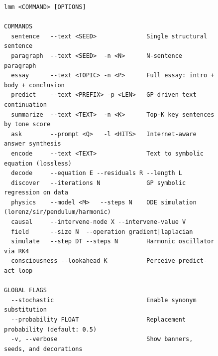 \documentclass[11pt,a4paper]{article}
\newcommand{\lmm}{\texorpdfstring{%
  \textbf{\color{lmmAccent}LMM}}{LMM}}
\begin{document}
\begin{figure}[H]
\begin{lstlisting}[style=code, caption={\lmm{} CLI command summary}]
lmm <COMMAND> [OPTIONS]

COMMANDS
  sentence   --text <SEED>              Single structural sentence
  paragraph  --text <SEED>  -n <N>      N-sentence paragraph
  essay      --text <TOPIC> -n <P>      Full essay: intro + body + conclusion
  predict    --text <PREFIX> -p <LEN>   GP-driven text continuation
  summarize  --text <TEXT>  -n <K>      Top-K key sentences by tone score
  ask        --prompt <Q>   -l <HITS>   Internet-aware answer synthesis
  encode     --text <TEXT>              Text to symbolic equation (lossless)
  decode     --equation E --residuals R --length L
  discover   --iterations N             GP symbolic regression on data
  physics    --model <M>   --steps N    ODE simulation (lorenz/sir/pendulum/harmonic)
  causal     --intervene-node X --intervene-value V
  field      --size N  --operation gradient|laplacian
  simulate   --step DT --steps N        Harmonic oscillator via RK4
  consciousness --lookahead K           Perceive-predict-act loop

GLOBAL FLAGS
  --stochastic                          Enable synonym substitution
  --probability FLOAT                   Replacement probability (default: 0.5)
  -v, --verbose                         Show banners, seeds, and decorations
\end{lstlisting}
\end{figure}
\end{document}
